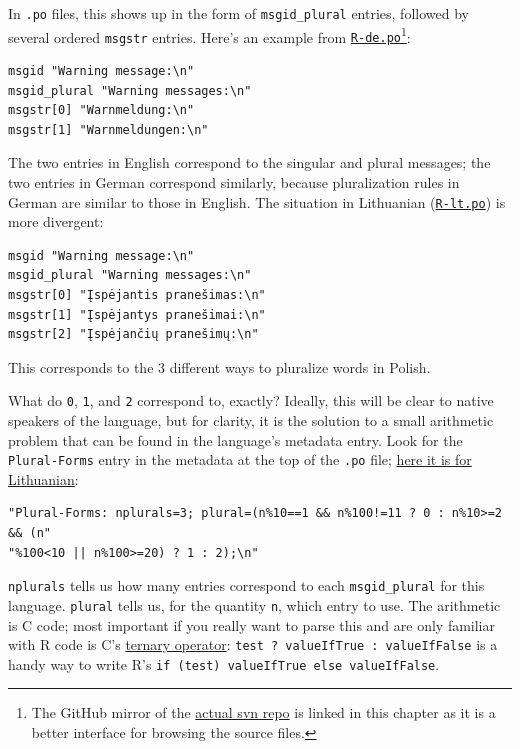 \documentclass[
]{book}
\begin{document}
In \texttt{.po} files, this shows up in the form of \texttt{msgid\_plural} entries,
followed by several ordered \texttt{msgstr} entries. Here's an example from
\href{https://github.com/r-devel/r-svn/blob/c715d61cb74b3fee2d035faed9b258e86e420b75/src/library/base/po/R-de.po\#L2015-L2018}{\texttt{R-de.po}}\footnote{The GitHub mirror of the \href{https://svn.r-project.org/R/trunk/}{actual svn
  repo} is linked in this chapter
  as it is a better interface for browsing the source files.}:

\begin{verbatim}
msgid "Warning message:\n"
msgid_plural "Warning messages:\n"
msgstr[0] "Warnmeldung:\n"
msgstr[1] "Warnmeldungen:\n"
\end{verbatim}

The two entries in English correspond to the singular and plural
messages; the two entries in German correspond similarly, because
pluralization rules in German are similar to those in English. The
situation in Lithuanian
(\href{https://github.com/r-devel/r-svn/blob/c715d61cb74b3fee2d035faed9b258e86e420b75/src/library/base/po/R-lt.po\#L1999-L2003}{\texttt{R-lt.po}})
is more divergent:

\begin{verbatim}
msgid "Warning message:\n"
msgid_plural "Warning messages:\n"
msgstr[0] "Įspėjantis pranešimas:\n"
msgstr[1] "Įspėjantys pranešimai:\n"
msgstr[2] "Įspėjančių pranešimų:\n"
\end{verbatim}

This corresponds to the 3 different ways to pluralize words in Polish.

What do \texttt{0}, \texttt{1}, and \texttt{2} correspond to, exactly? Ideally, this will be
clear to native speakers of the language, but for clarity, it is the
solution to a small arithmetic problem that can be found in the
language's metadata entry. Look for the \texttt{Plural-Forms} entry in the
metadata at the top of the \texttt{.po} file; \href{https://github.com/r-devel/r-svn/blob/c715d61cb74b3fee2d035faed9b258e86e420b75/src/library/base/po/R-lt.po\#L18-L19}{here it is for
Lithuanian}:

\begin{verbatim}
"Plural-Forms: nplurals=3; plural=(n%10==1 && n%100!=11 ? 0 : n%10>=2 && (n"
"%100<10 || n%100>=20) ? 1 : 2);\n"
\end{verbatim}

\texttt{nplurals} tells us how many entries correspond to each \texttt{msgid\_plural}
for this language. \texttt{plural} tells us, for the quantity \texttt{n}, which entry
to use. The arithmetic is C code; most important if you really want to
parse this and are only familiar with R code is C's \href{https://en.wikipedia.org/wiki/\%3F:}{ternary
operator}:
\texttt{test\ ?\ valueIfTrue\ :\ valueIfFalse} is a handy way to write R's
\texttt{if\ (test)\ valueIfTrue\ else\ valueIfFalse}.
\end{document}
